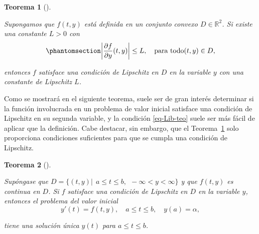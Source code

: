 \documentclass[
  spanish,
  us-letterpaper,
  DIV=11,
  numbers=noendperiod]{scrreprt}
\theoremstyle{definition}
\theoremstyle{plain}
\newtheorem{theorem}{Teorema}[chapter]
\theoremstyle{remark}
\begin{document}
\begin{theorem}[]\protect\hypertarget{thm-Lib-teo}{}\label{thm-Lib-teo}

Supongamos que \(f(t, y)\) está definida en un conjunto convexo
\(D \in \mathbb{R}^2\). Si existe una constante \(L > 0\) con
\begin{equation}\phantomsection\label{eq-Lib-teo}{
\left|\dfrac{\partial f}{\partial y}(t,y) \right| \leq L, \quad \text{para todo} (t,y)\in D,
}\end{equation}

entonces \(f\) satisface una condición de Lipschitz en \(D\) en la
variable \(y\) con una constante de Lipschitz \(L\).

\end{theorem}

Como se mostrará en el siguiente teorema, suele ser de gran interés
determinar si la función involucrada en un problema de valor inicial
satisface una condición de Lipschitz en su segunda variable, y la
condición \ref{eq-Lib-teo} suele ser más fácil de aplicar que la
definición. Cabe destacar, sin embargo, que el Teorema~\ref{thm-Lib-teo}
solo proporciona condiciones suficientes para que se cumpla una
condición de Lipschitz.

\begin{theorem}[]\protect\hypertarget{thm-uniq-sol}{}\label{thm-uniq-sol}

Supóngase que
\(D = \{(t, y) | \ \ a \leq t \leq b, \ \  -\infty < y < \infty \}\) y
que \(f (t, y)\) es continua en \(D\). Si \(f\) satisface una condición
de Lipschitz en \(D\) en la variable \(y\), entonces el problema del
valor inicial \[
y'(t)= f(t,y), \quad a\leq t \leq b, \quad y(a) = \alpha,
\]

tiene una solución única \(y(t)\) para \(a\leq t \leq b\).

\end{theorem}
\end{document}
